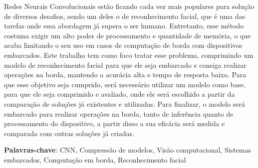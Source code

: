 \setlength{\absparsep}{18pt} %
\begin{resumo}

Redes Neurais Convolucionais estão ficando cada vez mais populares para solução de diversos desafios, sendo um deles
o de reconhecimento facial, que é uma das tarefas onde essa abordagem já supera o ser humano.
Entretanto, esse método costuma exigir um alto poder de processamento e quantidade de memória, o que acaba
limitando o seu uso em casos de computação de borda com dispositivos embarcados.
Este trabalho tem como foco tratar esse problema, comprimindo um modelo de reconhecimento facial para que ele seja
embarcado e consiga realizar operações na borda, mantendo a acurácia alta e tempo de resposta baixo.
Para que esse objetivo seja cumprido, será necessário utilizar um modelo como base, para que ele seja comprimido e
avaliado, onde ele será escolhido a partir da comparação de soluções já existentes e utilizadas.
Para finalizar, o modelo será embarcado para realizar operações na borda, tanto de inferência quanto de processamento
do dispositivo, a partir disso a sua eficácia será medida e comparada com outras soluções já criadas.

 \textbf{Palavras-chave}: CNN, Compressão de modelos, Visão computacional, Sistemas embarcados, Computação em borda,
 Reconhecimento facial
\end{resumo}
